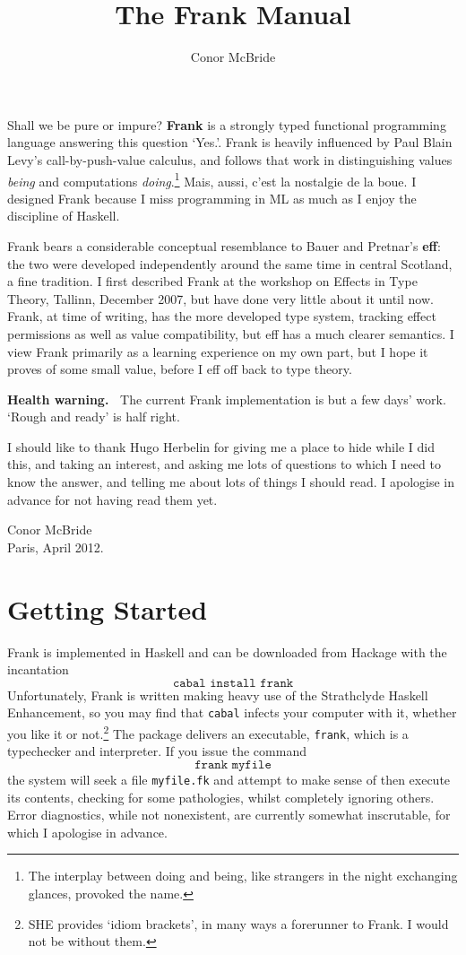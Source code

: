 \documentclass{article}
\begin{document}
\title{The Frank Manual}
\author{Conor McBride}
\maketitle

Shall we be pure or impure? \textbf{Frank} is a strongly typed functional programming language answering this question `Yes.'. Frank is heavily influenced by Paul Blain Levy's call-by-push-value calculus, and follows that work in distinguishing values \emph{being} and computations \emph{doing}.\footnote{The interplay between doing and being, like strangers in the night exchanging glances, provoked the name.} Mais, aussi, c'est la nostalgie de la boue. I designed Frank because I miss programming in ML as much as I enjoy the discipline of Haskell.

Frank bears a considerable conceptual resemblance to Bauer and Pretnar's \textbf{eff}: the two were developed independently around the same time in central Scotland, a fine tradition. I first described Frank at the workshop on Effects in Type Theory, Tallinn, December 2007, but have done very little about it until now. Frank, at time of writing, has the more developed type system, tracking effect permissions as well as value compatibility, but eff has a much clearer semantics. I view Frank primarily as a learning experience on my own part, but I hope it proves of some small value, before I eff off back to type theory.

\textbf{Health warning.~} The current Frank implementation is but a few days' work. `Rough and ready' is half right.

I should like to thank Hugo Herbelin for giving me a place to hide while I did this, and taking an interest, and asking me lots of questions to which I need to know the answer, and telling me about lots of things I should read.
I apologise in advance for not having read them yet.

Conor McBride\\
Paris, April 2012.


\section{Getting Started}

Frank is implemented in Haskell and can be downloaded from
Hackage with the incantation
\[
  \texttt{cabal install frank}
\]
Unfortunately, Frank is written making heavy use of the Strathclyde Haskell Enhancement, so you may find that \texttt{cabal} infects your computer with it, whether you like it or not.\footnote{SHE provides
`idiom brackets', in many ways a forerunner to Frank. I would not be without them.} The package delivers an executable, \texttt{frank},
which is a typechecker and interpreter. If you issue the command
\[
  \texttt{frank myfile}
\]
the system will seek a file \texttt{myfile.fk} and attempt to make sense of then execute its contents, checking for some pathologies, whilst completely ignoring others. Error diagnostics, while not nonexistent, are
currently somewhat inscrutable, for which I apologise in advance.
\end{document}
